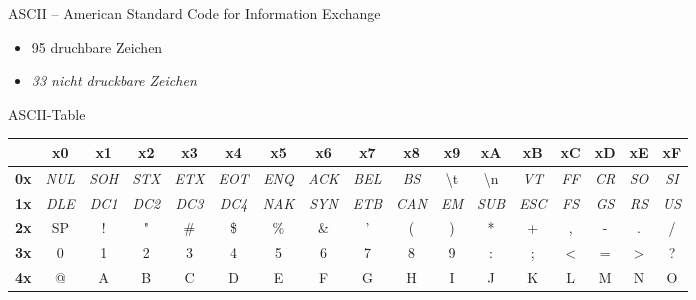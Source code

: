\documentclass[xelatex,aspectratio=169]{beamer}
\begin{document}
\begin{frame}{ASCII -- American Standard Code for Information Exchange}
    \begin{itemize}
        \item 95 druchbare Zeichen
        \item \textit{33 nicht druckbare Zeichen}
    \end{itemize}

    \begin{exampleblock}{ASCII-Table}
        \centering
        \setlength{\tabcolsep}{0.3em}
        \begin{tabular}{lcccccccccccccccc}
            \toprule
                        & \textbf{x0}  & \textbf{x1}  & \textbf{x2}  & \textbf{x3}  & \textbf{x4}  & \textbf{x5}  & \textbf{x6}  & \textbf{x7}  & \textbf{x8}  & \textbf{x9}       & \textbf{xA}       & \textbf{xB}  & \textbf{xC}      & \textbf{xD} & \textbf{xE} & \textbf{xF}  \\
            \midrule
            \textbf{0x} & \textit{NUL} & \textit{SOH} & \textit{STX} & \textit{ETX} & \textit{EOT} & \textit{ENQ} & \textit{ACK} & \textit{BEL} & \textit{BS}  & \textbackslash{}t & \textbackslash{}n & \textit{VT}  & \textit{FF}      & \textit{CR} & \textit{SO} & \textit{SI}  \\
            \textbf{1x} & \textit{DLE} & \textit{DC1} & \textit{DC2} & \textit{DC3} & \textit{DC4} & \textit{NAK} & \textit{SYN} & \textit{ETB} & \textit{CAN} & \textit{EM}       & \textit{SUB}      & \textit{ESC} & \textit{FS}      & \textit{GS} & \textit{RS} & \textit{US}  \\
            \textbf{2x} & SP           & !            & "            & \#           & \$           & \%           & \&           & '            & (            & )                 & *                 & +            & ,                & -           & .           & /            \\
            \textbf{3x} & 0            & 1            & 2            & 3            & 4            & 5            & 6            & 7            & 8            & 9                 & :                 & ;            & <                & =           & >           & ?            \\
            \textbf{4x} & @            & A            & B            & C            & D            & E            & F            & G            & H            & I                 & J                 & K            & L                & M           & N           & O            \\

\end{tabular}
\end{exampleblock}
\end{frame}
\end{document}
